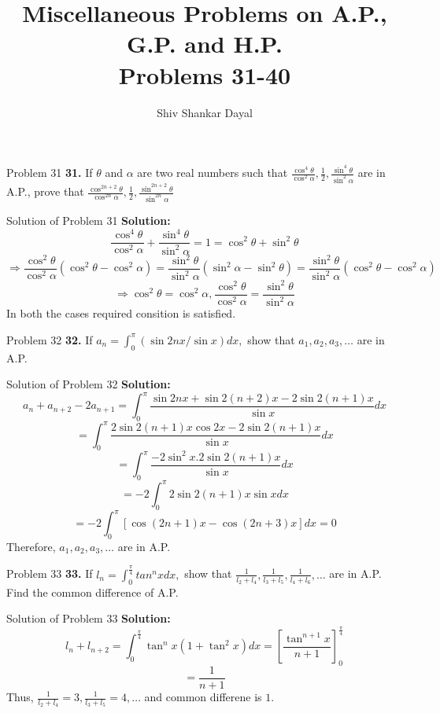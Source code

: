 \documentclass[aspectratio=1610,8pt]{beamer}
\title{Miscellaneous Problems on A.P., G.P. and H.P.\\Problems 31-40}
\author[Shiv Shankar Dayal]{Shiv Shankar Dayal}
\begin{document}
\begin{frame}
  \titlepage
\end{frame}
\begin{frame}{Problem 31}
  \textbf{31.} If $\theta$ and $\alpha$ are two real numbers such that $\frac{\cos^4\theta}{\cos^2\alpha}, \frac{1}{2},
  \frac{\sin^4\theta}{\sin^2\alpha}$ are in A.P., prove that $\frac{\cos^{2n + 2}\theta}{\cos^{2n}\alpha}, \frac{1}{2},
  \frac{\sin^{2n + 2}\theta}{\sin^{2n}\alpha}$
\end{frame}
\begin{frame}{Solution of Problem 31}
  \textbf{Solution:} $$\frac{\cos^4\theta}{\cos^2\alpha} + \frac{\sin^4\theta}{\sin^2\alpha} = 1 = \cos^2\theta + \sin^2\theta$$
  $$\Rightarrow \frac{\cos^2\theta}{\cos^2\alpha}(\cos^2\theta - \cos^2\alpha) = \frac{\sin^2\theta}{\sin^2\alpha}(\sin^2\alpha -
  \sin^2\theta) = \frac{\sin^2\theta}{\sin^2\alpha}(\cos^2\theta - \cos^2\alpha)$$
  $$\Rightarrow \cos^2\theta = \cos^2\alpha, \frac{\cos^2\theta}{\cos^2\alpha} = \frac{\sin^2\theta}{\sin^2\alpha}$$
  In both the cases required consition is satisfied.
\end{frame}
\begin{frame}{Problem 32}
  \textbf{32.} If $a_n = \int_0^\pi (\sin 2nx/\sin x)dx,$ show that $a_1, a_2, a_3, \ldots$ are in A.P.
\end{frame}
\begin{frame}{Solution of Problem 32}
  \textbf{Solution:} $$a_n + a_{n + 2} - 2a_{n + 1} = \int_0^\pi \frac{\sin 2nx + \sin2(n + 2)x - 2\sin2(n + 1)x}{\sin x}dx$$
  $$= \int_0^\pi \frac{2\sin2(n + 1)x\cos 2x - 2\sin2(n + 1)x}{\sin x}dx$$
  $$= \int_0^\pi \frac{-2\sin^2x.2\sin2(n + 1)x}{\sin x}dx$$
  $$= -2\int_0^\pi 2\sin2(n + 1)x\sin xdx$$
  $$= -2\int_0^\pi[\cos(2n + 1)x - \cos(2n + 3)x]dx = 0$$
  Therefore, $a_1, a_2, a_3, \ldots$ are in A.P.
\end{frame}
\begin{frame}{Problem 33}
  \textbf{33.} If $l_n = \int_0^{\frac{\pi}{4}}tan^nxdx,$ show that $\frac{1}{l_2 + l_4}, \frac{1}{l_3 + l_5}, \frac{1}{l_4 + l_6},
  \ldots$ are in A.P. Find the common difference of A.P.
\end{frame}
\begin{frame}{Solution of Problem 33}
  \textbf{Solution:} $$l_n + l_{n + 2} = \int_0^{\frac{\pi}{4}}\tan^nx(1 + \tan^2x)dx = \left[\frac{\tan^{n + 1}x}{n +
      1}\right]_0^{\frac{\pi}{4}}$$
  $$= \frac{1}{n + 1}$$
  Thus, $\frac{1}{l_2 + l_4} = 3, \frac{1}{l_3 + l_5} = 4, \ldots$ and common differene is $1.$
\end{frame}
\end{document}

